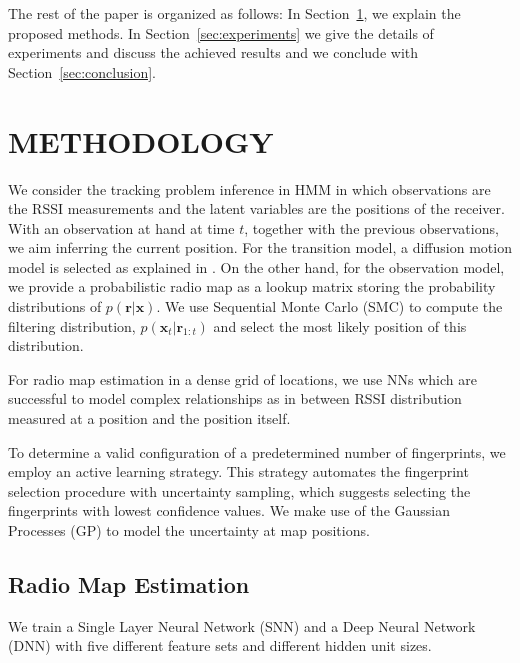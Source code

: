 \documentclass{article}
\newcommand{\x}{\mathbf{x}}
\newcommand{\myr}{\mathbf{r}}
\begin{document}
	
	The rest of the paper is organized as follows: In Section~\ref{sec:methodology}, we explain the proposed methods. In Section~\ref{sec:experiments} we give the details of experiments and discuss the achieved results and we conclude with Section~\ref{sec:conclusion}.
	
	\section{METHODOLOGY}
	\label{sec:methodology}
	We consider the tracking problem inference in HMM \cite{barberBRML2012} in which observations are the RSSI measurements and the latent variables are the positions of the receiver. With an observation at hand at time $t$, together with the previous observations, we aim inferring the current position. For the transition model, a diffusion motion model is selected as explained in \cite{Ser2017}. On the other hand, for the observation model, we provide a probabilistic radio map as a lookup matrix storing the probability distributions of $p(\myr|\x)$. We use Sequential Monte Carlo (SMC) to compute the filtering distribution, $p(\x_t|\myr_{1:t})$ and select the most likely position of this distribution.
	
	For radio map estimation in a dense grid of locations, we use NNs which are successful to model complex relationships as in between RSSI distribution measured at a position and the position itself. 
	
	To determine a valid configuration of a predetermined number of fingerprints, we employ an active learning strategy. This strategy automates the fingerprint selection procedure with uncertainty sampling, which suggests selecting the fingerprints with lowest confidence values. We make use of the Gaussian Processes (GP) to model the uncertainty at map positions.
	
	\subsection{Radio Map Estimation}
	We train a Single Layer Neural Network (SNN) and a Deep Neural Network (DNN) with five different feature sets and different hidden unit sizes.
	
\end{document}
